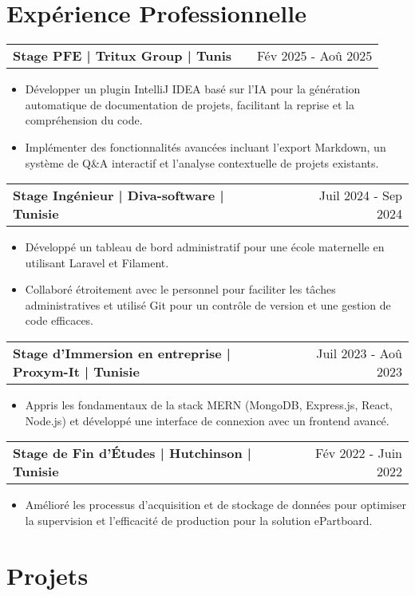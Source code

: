 \documentclass[a4paper,11pt]{article}
\makeatletter
\newenvironment{jobshort}[2]
    {
    \begin{tabularx}{\linewidth}{@{}l X r@{}}
    \textbf{#1} & \hfill &  #2 \\[2.75pt]
    \end{tabularx}
    \begin{minipage}[t]{\linewidth}
    \begin{itemize}[nosep,after=\strut, leftmargin=1em, itemsep=2pt]
    }
    {
    \end{itemize}
    \end{minipage}
    }
\makeatother
\begin{document}
\section{Expérience Professionnelle}

\begin{jobshort}{Stage PFE | Tritux Group | Tunis}{Fév 2025 - Aoû 2025}
\item Développer un plugin IntelliJ IDEA basé sur l'IA pour la génération automatique de documentation de projets, facilitant la reprise et la compréhension du code.
\item Implémenter des fonctionnalités avancées incluant l'export Markdown, un système de Q\&A interactif et l'analyse contextuelle de projets existants.
\end{jobshort}

\begin{jobshort}{Stage Ingénieur | Diva-software | Tunisie}{Juil 2024 - Sep 2024}
\item Développé un tableau de bord administratif pour une école maternelle en utilisant Laravel et Filament.
\item Collaboré étroitement avec le personnel pour faciliter les tâches administratives et utilisé Git pour un contrôle de version et une gestion de code efficaces.
\end{jobshort}

\begin{jobshort}{Stage d'Immersion en entreprise | Proxym-It | Tunisie}{Juil 2023 - Aoû 2023}
\item Appris les fondamentaux de la stack MERN (MongoDB, Express.js, React, Node.js) et développé une interface de connexion avec un frontend avancé.
\end{jobshort}

\begin{jobshort}{Stage de Fin d'Études | Hutchinson | Tunisie}{Fév 2022 - Juin 2022}
\item Amélioré les processus d'acquisition et de stockage de données pour optimiser la supervision et l'efficacité de production pour la solution ePartboard.
\end{jobshort}
  
\section{Projets}
\end{document}
